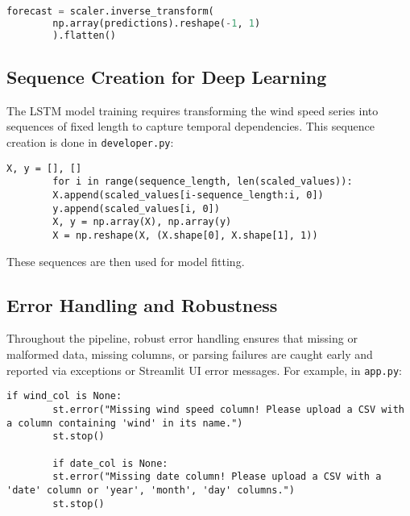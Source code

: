 \begin{framed}
	\begin{lstlisting}[language=Python]
		forecast = scaler.inverse_transform(
		np.array(predictions).reshape(-1, 1)
		).flatten()
	\end{lstlisting}
\end{framed}






\subsection{Sequence Creation for Deep Learning}

The LSTM model training requires transforming the wind speed series into sequences of fixed length to capture temporal dependencies. This sequence creation is done in \texttt{developer.py}:

\lstset{breaklines=true}
\begin{framed}
	\begin{lstlisting}[basicstyle=\ttfamily\small]
		X, y = [], []
		for i in range(sequence_length, len(scaled_values)):
		X.append(scaled_values[i-sequence_length:i, 0])
		y.append(scaled_values[i, 0])
		X, y = np.array(X), np.array(y)
		X = np.reshape(X, (X.shape[0], X.shape[1], 1))
	\end{lstlisting}
\end{framed}

These sequences are then used for model fitting.

\subsection{Error Handling and Robustness}

Throughout the pipeline, robust error handling ensures that missing or malformed data, missing columns, or parsing failures are caught early and reported via exceptions or Streamlit UI error messages. For example, in \texttt{app.py}:

\lstset{breaklines=true}
\begin{framed}
	\begin{lstlisting}[basicstyle=\ttfamily\small]
		if wind_col is None:
		st.error("Missing wind speed column! Please upload a CSV with a column containing 'wind' in its name.")
		st.stop()
		
		if date_col is None:
		st.error("Missing date column! Please upload a CSV with a 'date' column or 'year', 'month', 'day' columns.")
		st.stop()
	\end{lstlisting}
\end{framed}



